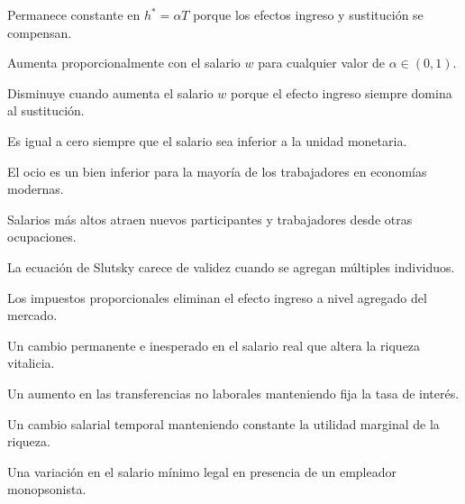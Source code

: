 \begin{opts}
    \item Permanece constante en $h^* = \alpha T$ porque los efectos ingreso y sustitución se compensan.
    \item Aumenta proporcionalmente con el salario $w$ para cualquier valor de $\alpha \in (0,1)$.
    \item Disminuye cuando aumenta el salario $w$ porque el efecto ingreso siempre domina al sustitución.
    \item Es igual a cero siempre que el salario sea inferior a la unidad monetaria.
\end{opts}

\begin{opts}
    \item El ocio es un bien inferior para la mayoría de los trabajadores en economías modernas.
    \item Salarios más altos atraen nuevos participantes y trabajadores desde otras ocupaciones.
    \item La ecuación de Slutsky carece de validez cuando se agregan múltiples individuos.
    \item Los impuestos proporcionales eliminan el efecto ingreso a nivel agregado del mercado.
\end{opts}

\begin{opts}
    \item Un cambio permanente e inesperado en el salario real que altera la riqueza vitalicia.
    \item Un aumento en las transferencias no laborales manteniendo fija la tasa de interés.
    \item Un cambio salarial temporal manteniendo constante la utilidad marginal de la riqueza.
    \item Una variación en el salario mínimo legal en presencia de un empleador monopsonista.
\end{opts}

